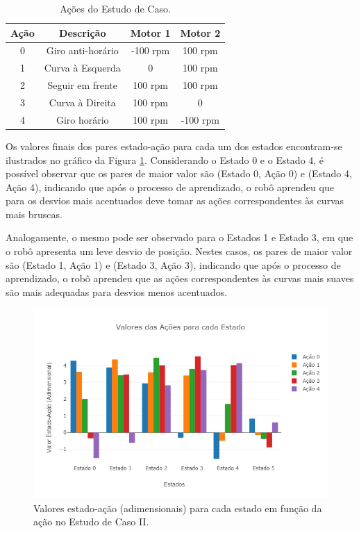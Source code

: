 \documentclass[a4paper]{ifacconf}
\begin{document}
\begin{table}
\centering
\caption{Ações do Estudo de Caso.} \label{tab:intermediateActionsTab}
\begin{tabular}{cccc}
Ação & Descrição & Motor 1 & Motor 2\\ \hline
0 & Giro anti-horário & -100 rpm & 100 rpm\\ 
1 & Curva à Esquerda & 0 & 100 rpm\\ 
2 & Seguir em frente & 100 rpm & 100 rpm \\
3 & Curva à Direita & 100 rpm & 0\\
4 & Giro horário & 100 rpm & -100 rpm\\ \hline
\end{tabular}
\end{table}

Os valores finais dos pares estado-ação para cada um dos estados encontram-se ilustrados no gráfico da Figura \ref{fig:enhanced_chart1}. Considerando o Estado 0 e o Estado 4, é possível observar que os pares de maior valor são (Estado 0, Ação 0) e (Estado 4, Ação 4), indicando que após o processo de aprendizado, o robô aprendeu que para os desvios mais acentuados deve tomar as ações correspondentes às curvas mais bruscas. 

Analogamente, o mesmo pode ser observado para o Estados 1 e Estado 3, em que o robô apresenta um leve desvio de posição. Nestes casos, os pares de maior valor são (Estado 1, Ação 1) e (Estado 3, Ação 3), indicando que após o processo de aprendizado, o robô aprendeu que as ações correspondentes às curvas mais suaves são mais adequadas para desvios menos acentuados.

\begin{figure}
\centering 
\includegraphics[scale=0.35]{Figuras/enhanced_chart1.png}
\caption{Valores estado-ação (adimensionais) para cada estado em função da ação no Estudo de Caso II.} \label{fig:enhanced_chart1}
\end{figure}
\end{document}
